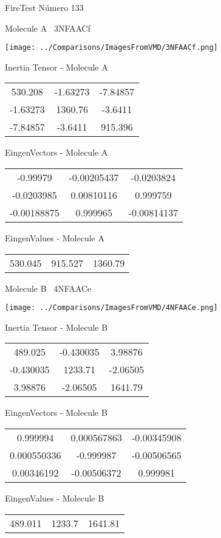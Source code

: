 \vtab[-3cm]
\begin{center}
{\large FireTest \tab Número 133}
\end{center}
\begin{multicols}{2}
\begin{center}

Molecule A \
3NFAACf

\texttt{[image: ../Comparisons/ImagesFromVMD/3NFAACf.png]}

Inertia Tensor - Molecule A \\
\begin{tabular}{|c c c|}
530.208	 & 	-1.63273	 & 	-7.84857	 \\
-1.63273	 & 	1360.76	 & 	-3.6411	 \\
-7.84857	 & 	-3.6411	 & 	915.396
\end{tabular}

\vtab
 EingenVectors - Molecule A     \\
\begin{tabular}{|c c c|}
-0.99979	 & 	-0.00205437	 & 	-0.0203824	 \\
-0.0203985	 & 	0.00810116	 & 	0.999759	 \\
-0.00188875	 & 	0.999965	 & 	-0.00814137
\end{tabular}

\vtab
 EingenValues - Molecule A     \\
\begin{tabular}{|c c c|}
530.045	 & 	915.527	 & 	1360.79	 \\
\end{tabular}
\columnbreak

Molecule B \
4NFAACe

\texttt{[image: ../Comparisons/ImagesFromVMD/4NFAACe.png]}

Inertia Tensor - Molecule B \\
\begin{tabular}{|c c c|}
489.025	 & 	-0.430035	 & 	3.98876	 \\
-0.430035	 & 	1233.71	 & 	-2.06505	 \\
3.98876	 & 	-2.06505	 & 	1641.79
\end{tabular}

\vtab
 EingenVectors - Molecule B     \\
\begin{tabular}{|c c c|}
0.999994	 & 	0.000567863	 & 	-0.00345908	 \\
0.000550336	 & 	-0.999987	 & 	-0.00506565	 \\
0.00346192	 & 	-0.00506372	 & 	0.999981
\end{tabular}

\vtab
 EingenValues - Molecule B     \\
\begin{tabular}{|c c c|}
489.011	 & 	1233.7	 & 	1641.81	 \\
\end{tabular}

\end{center}
\end{multicols}

